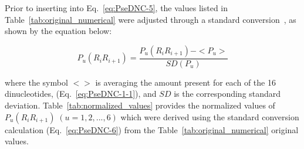 Prior to inserting into Eq.~\ref{eq:PseDNC-5}, the values listed in Table~\ref{tab:original_numerical} were adjusted through a standard conversion~\cite{Chou2005UsingClasses}, as shown by the equation below:

\begin{equation}\label{eq:PseDNC-6}
    P_{u}(R_{i}R_{i+1}) = \frac{P_{u}(R_{i}R_{i+1}) - <P_{u}>}{SD(P_{u})}
\end{equation}

\noindent where the symbol $<>$ is averaging the amount present for each of the 16 dinucleotides, (Eq.~\ref{eq:PseDNC-1-1}), and $SD$ is the corresponding standard deviation. Table~\ref{tab:normalized_values} provides the normalized values of $P_{u}(R_{i}R_{i+1})\;(u = 1,2,...,6)$ which were derived using the standard conversion calculation (Eq.~\ref{eq:PseDNC-6}) from the Table~\ref{tab:original_numerical} original values.

